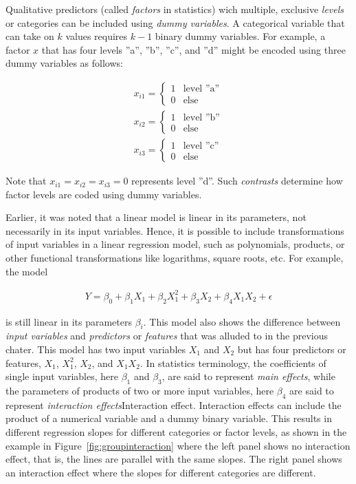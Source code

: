 Qualitative predictors (called \emph{factors} in statistics) wich multiple, exclusive \emph{levels} or categories can be included using \emph{dummy variables}. A categorical variable that can take on $k$ values requires $k-1$ binary dummy variables. For example, a factor $x$ that has four levels ''a'', ''b'', ''c'', and ''d'' might be encoded using three dummy variables as follows:

\begin{align*}
x_{i1} = \begin{cases}
1 & \text{level ''a''} \\
0 & \text{else}
\end{cases} \\
x_{i2} = \begin{cases}
1 & \text{level ''b''} \\
0 & \text{else}
\end{cases} \\
x_{i3} = \begin{cases}
1 & \text{level ''c''} \\
0 & \text{else}
\end{cases}
\end{align*}

\noindent Note that $x_{i1} = x_{i2} = x_{i3} = 0$ represents level ''d''. Such \emph{contrasts} determine how factor levels are coded using dummy variables.

Earlier, it was noted that a linear model is linear in its parameters, not necessarily in its input variables. Hence, it is possible to include transformations of input variables in a linear regression model, such as polynomials, products, or other functional transformations like logarithms, square roots, etc. For example, the model

\begin{align*}
Y = \beta_0 + \beta_1 X_1 + \beta_2 X_1^2 + \beta_3 X_2 + \beta_4 X_1 X_2 + \epsilon
\end{align*}

\noindent is still linear in its parameters $\beta_i$. This model also shows the difference between \emph{input variables} and \emph{predictors} or \emph{features} that was alluded to in the previous chater. This model has two input variables $X_1$ and $X_2$ but has four predictors or features, $X_1$, $X_1^2$, $X_2$, and $X_1 X_2$. In statistics terminology, the coefficients of single input variables, here $\beta_1$ and $\beta_3$, are said to represent \emph{main effects}, while the parameters of products of two or more input variables, here $\beta_4$ are said to represent \emph{interaction effects}{Interaction effect}. Interaction effects can include the product of a numerical variable and a dummy binary variable. This results in different regression slopes for different categories or factor levels, as shown in the example in Figure~\ref{fig:groupinteraction} where the left panel shows no interaction effect, that is, the lines are parallel with the same slopes. The right panel shows an interaction effect where the slopes for different categories are different.

